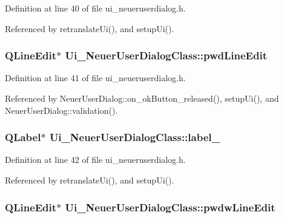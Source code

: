 Definition at line 40 of file ui\_\-neueruserdialog.h.

Referenced by retranslateUi(), and setupUi().\hypertarget{class_ui___neuer_user_dialog_class_ac993e337eddb7945b3a93fdcc06572d}{
\subsubsection[pwdLineEdit]{\setlength{\rightskip}{0pt plus 5cm}QLineEdit$\ast$ {\bf Ui\_\-NeuerUserDialogClass::pwdLineEdit}}}
\label{class_ui___neuer_user_dialog_class_ac993e337eddb7945b3a93fdcc06572d}




Definition at line 41 of file ui\_\-neueruserdialog.h.

Referenced by NeuerUserDialog::on\_\-okButton\_\-released(), setupUi(), and NeuerUserDialog::validation().\hypertarget{class_ui___neuer_user_dialog_class_381e9cf8cf008afb4e1d81749e8a840b}{
\subsubsection[label\_\-3]{\setlength{\rightskip}{0pt plus 5cm}QLabel$\ast$ {\bf Ui\_\-NeuerUserDialogClass::label\_}}}
\label{class_ui___neuer_user_dialog_class_381e9cf8cf008afb4e1d81749e8a840b}




Definition at line 42 of file ui\_\-neueruserdialog.h.

Referenced by retranslateUi(), and setupUi().\hypertarget{class_ui___neuer_user_dialog_class_41b5e6f827c399209e918157bd1035d6}{
\subsubsection[pwdwLineEdit]{\setlength{\rightskip}{0pt plus 5cm}QLineEdit$\ast$ {\bf Ui\_\-NeuerUserDialogClass::pwdwLineEdit}}}
\label{class_ui___neuer_user_dialog_class_41b5e6f827c399209e918157bd1035d6}





